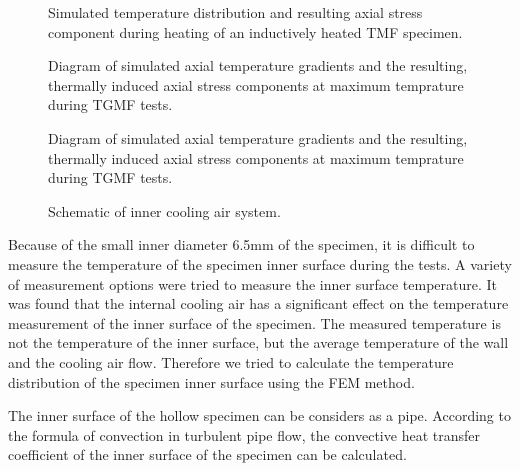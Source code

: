 \documentclass{article}
\begin{document}
\begin{figure}[!htp]
\caption{Simulated temperature distribution and resulting axial stress component during heating of an inductively heated TMF specimen.}
\label{Fig:FEM}
\end{figure}

\begin{figure}[!htp]
\caption{Diagram of simulated axial temperature gradients and the resulting, thermally induced axial stress components at maximum temprature during TGMF tests.}
\label{Fig:plot_temperature_along_gauge_length}
\end{figure}

\begin{figure}[!htp]
\caption{Diagram of simulated axial temperature gradients and the resulting, thermally induced axial stress components at maximum temprature during TGMF tests.}
\label{Fig:plot_temperature_along_radial_direction}
\end{figure}

\begin{figure}[!htp]
\caption{Schematic of inner cooling air system.}
\label{Fig:inner_cooling}
\end{figure}

Because of the small inner diameter 6.5mm of the specimen, it is difficult to measure the temperature of the specimen inner surface during the tests.
A variety of measurement options were tried to measure the inner surface temperature.
It was found that the internal cooling air has a significant effect on the temperature measurement of the inner surface of the specimen.
The measured temperature is not the temperature of the inner surface, but the average temperature of the wall and the cooling air flow.
Therefore we tried to calculate the temperature distribution of the specimen inner surface using the FEM method.


The inner surface of the hollow specimen can be considers as a pipe.
According to the formula of convection in turbulent pipe flow, the convective heat transfer coefficient of the inner surface of the specimen can be calculated.
\end{document}
